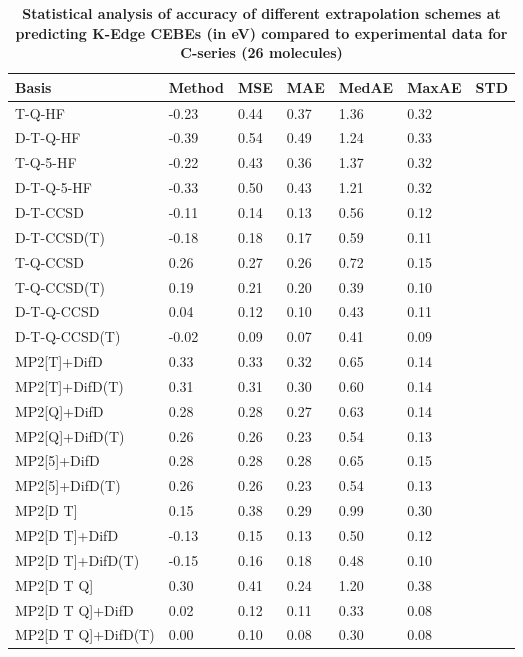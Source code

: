 \begin{table}
  \caption{\textbf{Statistical analysis of accuracy of different extrapolation schemes at predicting K-Edge CEBEs (in eV) compared to experimental data for C-series (26 molecules)}}
  \label{tbl:extrap-scheme-summary-c}
  \begin{tabular}{l l l l l l l }
    \toprule
    \textbf{Basis} & \textbf{Method} & \textbf{MSE} & \textbf{MAE} & \textbf{MedAE} & \textbf{MaxAE} & \textbf{STD} \\ 
    \midrule
    T-Q-HF & -0.23 & 0.44 & 0.37 & 1.36 & 0.32 \\ 
    D-T-Q-HF & -0.39 & 0.54 & 0.49 & 1.24 & 0.33 \\ 
    T-Q-5-HF & -0.22 & 0.43 & 0.36 & 1.37 & 0.32 \\ 
    D-T-Q-5-HF & -0.33 & 0.50 & 0.43 & 1.21 & 0.32 \\ 
    D-T-CCSD & -0.11 & 0.14 & 0.13 & 0.56 & 0.12 \\ 
    D-T-CCSD(T) & -0.18 & 0.18 & 0.17 & 0.59 & 0.11 \\ 
    T-Q-CCSD & 0.26 & 0.27 & 0.26 & 0.72 & 0.15 \\ 
    T-Q-CCSD(T) & 0.19 & 0.21 & 0.20 & 0.39 & 0.10 \\ 
    D-T-Q-CCSD & 0.04 & 0.12 & 0.10 & 0.43 & 0.11 \\ 
    D-T-Q-CCSD(T) & -0.02 & 0.09 & 0.07 & 0.41 & 0.09 \\ 
    MP2[T]+DifD & 0.33 & 0.33 & 0.32 & 0.65 & 0.14 \\ 
    MP2[T]+DifD(T) & 0.31 & 0.31 & 0.30 & 0.60 & 0.14 \\ 
    MP2[Q]+DifD & 0.28 & 0.28 & 0.27 & 0.63 & 0.14 \\ 
    MP2[Q]+DifD(T) & 0.26 & 0.26 & 0.23 & 0.54 & 0.13 \\ 
    MP2[5]+DifD & 0.28 & 0.28 & 0.28 & 0.65 & 0.15 \\ 
    MP2[5]+DifD(T) & 0.26 & 0.26 & 0.23 & 0.54 & 0.13 \\ 
    MP2[D T] & 0.15 & 0.38 & 0.29 & 0.99 & 0.30 \\ 
    MP2[D T]+DifD & -0.13 & 0.15 & 0.13 & 0.50 & 0.12 \\ 
    MP2[D T]+DifD(T) & -0.15 & 0.16 & 0.18 & 0.48 & 0.10 \\ 
    MP2[D T Q] & 0.30 & 0.41 & 0.24 & 1.20 & 0.38 \\ 
    MP2[D T Q]+DifD & 0.02 & 0.12 & 0.11 & 0.33 & 0.08 \\ 
    MP2[D T Q]+DifD(T) & 0.00 & 0.10 & 0.08 & 0.30 & 0.08 \\ 

\end{tabular}
\end{table}
